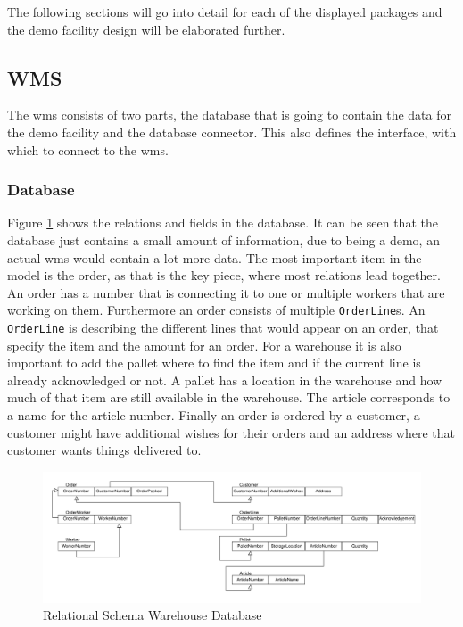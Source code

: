 The following sections will go into detail for each of the displayed packages and the demo facility design will be elaborated further.


\subsection{WMS}
The \acrlong{wms} consists of two parts, the database that is going to contain the data for the demo facility and the database connector. This also defines the interface, with which to connect to the \gls{wms}.

\subsubsection{Database}

Figure \ref{fig:LogicalModelWMS} shows the relations and fields in the database. It can be seen that the database just contains a small amount of information, due to being a demo, an actual \gls{wms} would contain a lot more data. The most important item in the model is the order, as that is the key piece, where most relations lead together. An order has a number that is connecting it to one or multiple workers that are working on them. Furthermore an order consists of multiple \texttt{OrderLine}s. An \texttt{OrderLine} is describing the different lines that would appear on an order, that specify the item and the amount for an order. For a warehouse it is also important to add the pallet where to find the item and if the current line is already acknowledged or not. A pallet has a location in the warehouse and how much of that item are still available in the warehouse. The article corresponds to a name for the article number. Finally an order is ordered by a customer, a customer might have additional wishes for their orders and an address where that customer wants things delivered to.

\begin{figure}[H]
	\includegraphics[width=\textwidth]{images/LogicalModel_MockWMS}
	\caption{Relational Schema Warehouse Database}
	\label{fig:LogicalModelWMS}
\end{figure}

